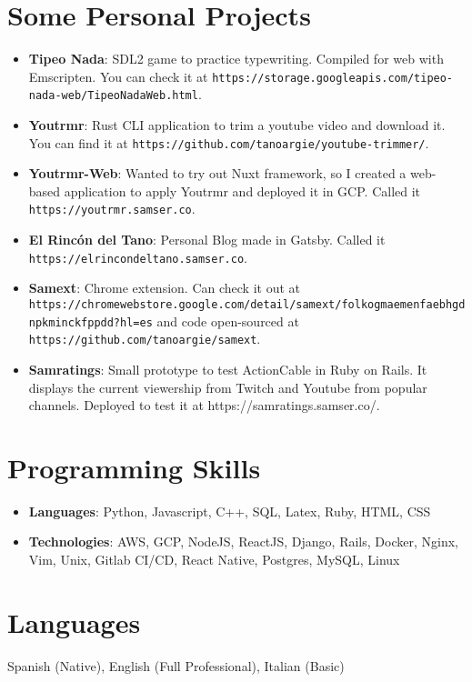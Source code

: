 \documentclass[letterpaper,11pt]{article}
\newcommand{\resumeItem}[2]{
  \item\small{
    \textbf{#1}{: #2 \vspace{-2pt}}
  }
}
\newcommand{\resumeSubItem}[2]{\resumeItem{#1}{#2}\vspace{-4pt}}
\newcommand{\resumeSubHeadingListStart}{\begin{itemize}[leftmargin=*]}
\newcommand{\resumeSubHeadingListEnd}{\end{itemize}}
\begin{document}
\section{Some Personal Projects}
 \resumeSubHeadingListStart
   \resumeSubItem{Tipeo Nada}
     {SDL2 game to practice typewriting. Compiled for web with Emscripten. You can check it at \nolinkurl{https://storage.googleapis.com/tipeo-nada-web/TipeoNadaWeb.html}.}
   \resumeSubItem{Youtrmr}
     {Rust CLI application to trim a youtube video and download it. You can find it at \nolinkurl{https://github.com/tanoargie/youtube-trimmer/}.}
   \resumeSubItem{Youtrmr-Web}
     {Wanted to try out Nuxt framework, so I created a web-based application to apply Youtrmr and deployed it in GCP. Called it \nolinkurl{https://youtrmr.samser.co}.}
   \resumeSubItem{El Rincón del Tano}
     {Personal Blog made in Gatsby. Called it \nolinkurl{https://elrincondeltano.samser.co}.}
   \resumeSubItem{Samext}
     {Chrome extension. Can check it out at \nolinkurl{https://chromewebstore.google.com/detail/samext/folkogmaemenfaebhgdnpkminckfppdd?hl=es} and code open-sourced at \nolinkurl{https://github.com/tanoargie/samext}.}
   \resumeSubItem{Samratings}
     {Small prototype to test ActionCable in Ruby on Rails. It displays the current viewership from Twitch and Youtube from popular channels. Deployed to test it at https://samratings.samser.co/.}
 \resumeSubHeadingListEnd


\section{Programming Skills}
  \resumeSubHeadingListStart
    \item{
      \textbf{Languages}{: Python, Javascript, C++, SQL, Latex, Ruby, HTML, CSS}
    }
    \item{
      \textbf{Technologies}{: AWS, GCP, NodeJS, ReactJS, Django, Rails, Docker, Nginx, Vim, Unix, Gitlab CI/CD, React Native, Postgres, MySQL, Linux}
    }
  \resumeSubHeadingListEnd



\section{Languages}
  {Spanish (Native), English (Full Professional), Italian (Basic)}

\end{document}
